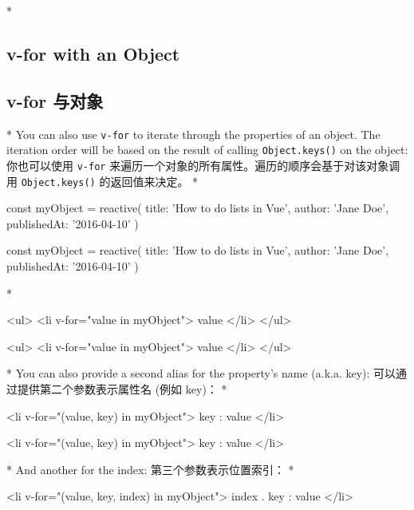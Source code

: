 \begin{paracol}{2}
\switchcolumn[0]*%
\subsection{v-for with an Object}
\switchcolumn
\subsection{v-for 与对象}
\switchcolumn[0]*%
You can also use \texttt{v-for} to iterate through the properties of an
object. The iteration order will be based on the result of calling
\texttt{Object.keys()} on the object:
\switchcolumn
你也可以使用 \texttt{v-for}
来遍历一个对象的所有属性。遍历的顺序会基于对该对象调用
\texttt{Object.keys()} 的返回值来决定。
\switchcolumn[0]*%
\begin{codeJs}
const myObject = reactive({
    title: 'How to do lists in Vue',
    author: 'Jane Doe',
    publishedAt: '2016-04-10'
})
\end{codeJs}
\switchcolumn
\begin{codeJs}
const myObject = reactive({
    title: 'How to do lists in Vue',
    author: 'Jane Doe',
    publishedAt: '2016-04-10'
})
\end{codeJs}
\switchcolumn[0]*%
\begin{codeHtml}
<ul>
    <li v-for="value in myObject">
    {{ value }}
    </li>
</ul>
\end{codeHtml}
\switchcolumn
\begin{codeHtml}
<ul>
    <li v-for="value in myObject">
    {{ value }}
    </li>
</ul>
\end{codeHtml}
\switchcolumn[0]*%
You can also provide a second alias for the property's name (a.k.a.
key):
\switchcolumn
可以通过提供第二个参数表示属性名 (例如 key)：
\switchcolumn[0]*%
\begin{codeHtml}
<li v-for="(value, key) in myObject">
    {{ key }}: {{ value }}
</li>
\end{codeHtml}
\switchcolumn
\begin{codeHtml}
<li v-for="(value, key) in myObject">
    {{ key }}: {{ value }}
</li>
\end{codeHtml}
\switchcolumn[0]*%
And another for the index:
\switchcolumn
第三个参数表示位置索引：
\switchcolumn[0]*%
\begin{codeHtml}
<li v-for="(value, key, index) in myObject">
    {{ index }}. {{ key }}: {{ value }}
</li>
\end{codeHtml}

\end{paracol}
